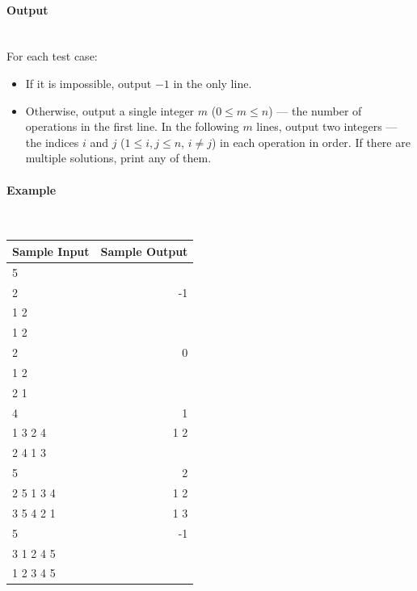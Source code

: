 \documentclass{article}
\begin{document}
\paragraph{Output}\mbox{} \\

For each test case:

\begin{itemize}
    \item If it is impossible, output $-1$ in the only line.
    \item Otherwise, output a single integer $m$ ($0 \le m \le n$) — the number of operations in the first line. In the following $m$ lines, output two integers — the indices $i$ and $j$ ($1 \le i, j \le n$, $i \ne j$) in each operation in order. If there are multiple solutions, print any of them.
\end{itemize}

\paragraph{Example}\mbox{} \\

\begin{table}[h]
    \centering
    \begin{tabular}{|l|r|}
        \hline
        \rowcolor{gray!30}
        \textbf{Sample Input} & \textbf{Sample Output} \\
        \hline
        5 & \\
        2 & -1 \\
        1 2 & \\
        1 2 & \\
        2 & 0 \\
        1 2 & \\
        2 1 & \\
        4 & 1 \\
        1 3 2 4 & 1 2 \\
        2 4 1 3 & \\
        5 & 2 \\
        2 5 1 3 4 & 1 2 \\
        3 5 4 2 1 & 1 3 \\
        5 & -1 \\
        3 1 2 4 5 & \\
        1 2 3 4 5 & \\
        \hline
    \end{tabular}
\end{table}
\end{document}
